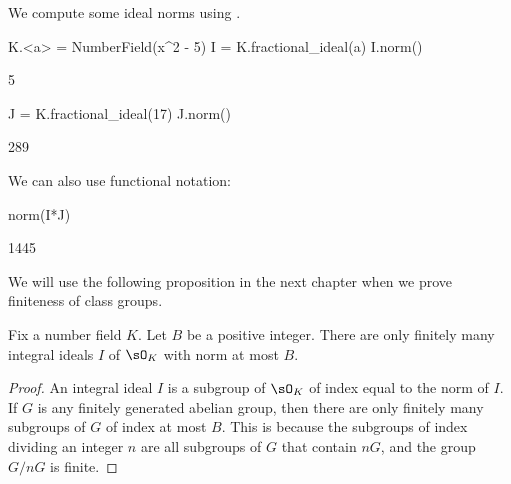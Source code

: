 \begin{example}
  We compute some ideal norms using {\Sage}.
\begin{sagecode}
\begin{sagecell}
K.<a> = NumberField(x^2 - 5)
I = K.fractional_ideal(a)
I.norm()
\end{sagecell}
\begin{sageout}
5
\end{sageout}
\begin{sagecell}
J = K.fractional_ideal(17)
J.norm()
\end{sagecell}
\begin{sageout}
289
\end{sageout}
\end{sagecode} %
  We can also use functional notation:
\begin{sagecode} %
\begin{sagecell}
norm(I*J)
\end{sagecell}
\begin{sageout}
1445
\end{sageout}
\end{sagecode}
\end{example}

We will use the following proposition in the next chapter when
we prove finiteness of class groups.
\begin{proposition}\label{prop:finitewithnorm}%
  Fix a number field $K$.
  Let $B$ be a positive integer.  There
  are only finitely many integral ideals
  $I$ of $\sO_K$ with norm at most $B$.
\end{proposition}
\begin{proof}
  An integral ideal $I$ is a subgroup of $\sO_K$ of index equal to the
  norm of $I$.  If $G$ is any finitely generated abelian group, then
  there are only finitely many subgroups of $G$ of index at most $B$.
  This is because the subgroups of index dividing an integer $n$ are all
  subgroups of $G$ that contain $nG$, and the group $G/nG$ is finite.
\end{proof}
